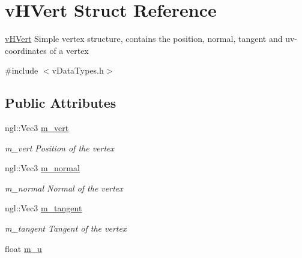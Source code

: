 \hypertarget{structvHVert}{\section{v\-H\-Vert Struct Reference}
\label{structvHVert}
}


\hyperlink{structvHVert}{v\-H\-Vert} Simple vertex structure, contains the position, normal, tangent and uv-\/coordinates of a vertex  




{\ttfamily \#include $<$v\-Data\-Types.\-h$>$}

\subsection*{Public Attributes}
\begin{DoxyCompactItemize}
\item 
\hypertarget{structvHVert_a7e721e8efe35dffeb03012573d62ff03}{ngl\-::\-Vec3 \hyperlink{structvHVert_a7e721e8efe35dffeb03012573d62ff03}{m\-\_\-vert}}\label{structvHVert_a7e721e8efe35dffeb03012573d62ff03}

\begin{DoxyCompactList}\small\item\em m\-\_\-vert Position of the vertex \end{DoxyCompactList}\item 
\hypertarget{structvHVert_a2e4685e344557cfe0349e82024b95a04}{ngl\-::\-Vec3 \hyperlink{structvHVert_a2e4685e344557cfe0349e82024b95a04}{m\-\_\-normal}}\label{structvHVert_a2e4685e344557cfe0349e82024b95a04}

\begin{DoxyCompactList}\small\item\em m\-\_\-normal Normal of the vertex \end{DoxyCompactList}\item 
\hypertarget{structvHVert_aa0b7acd4d261c5d15a76259a7aa1da96}{ngl\-::\-Vec3 \hyperlink{structvHVert_aa0b7acd4d261c5d15a76259a7aa1da96}{m\-\_\-tangent}}\label{structvHVert_aa0b7acd4d261c5d15a76259a7aa1da96}

\begin{DoxyCompactList}\small\item\em m\-\_\-tangent Tangent of the vertex \end{DoxyCompactList}\item 
\hypertarget{structvHVert_a3505f771b38733d4e8c6993ca7666828}{float \hyperlink{structvHVert_a3505f771b38733d4e8c6993ca7666828}{m\-\_\-u}}\label{structvHVert_a3505f771b38733d4e8c6993ca7666828}


\end{DoxyCompactItemize}
